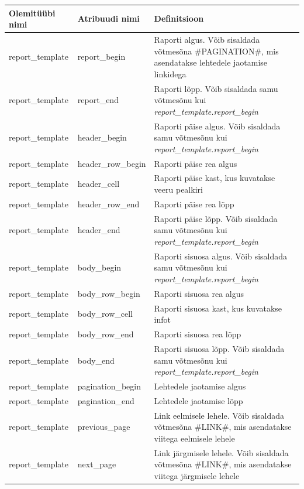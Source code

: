 \documentclass[a4paper,12pt]{article} %
\begin{document}
\begin{table}[H]
\centering
\begin{tabular}{|p{3cm}|p{3cm}|p{9cm}|}
\hline
\rowcolor{rowgray}
Olemitüübi nimi & Atribuudi nimi & Definitsioon \\ \hline

report\_template & report\_begin & Raporti algus. Võib sisaldada võtmesõna \#PAGINATION\#, mis asendatakse lehtedele jaotamise linkidega \\ \hline
report\_template & report\_end & Raporti lõpp. Võib sisaldada samu võtmesõnu kui \textit{report\_template.report\_begin} \\ \hline
report\_template & header\_begin & Raporti päise algus. Võib sisaldada samu võtmesõnu kui \textit{report\_template.report\_begin} \\ \hline
report\_template & header\_row\_begin & Raporti päise rea algus \\ \hline
report\_template & header\_cell & Raporti päise kast, kus kuvatakse veeru pealkiri \\ \hline
report\_template & header\_row\_end & Raporti päise rea lõpp \\ \hline
report\_template & header\_end & Raporti päise lõpp. Võib sisaldada samu võtmesõnu kui \textit{report\_template.report\_begin} \\ \hline
report\_template & body\_begin & Raporti sisuosa algus. Võib sisaldada samu võtmesõnu kui \textit{report\_template.report\_begin} \\ \hline
report\_template & body\_row\_begin & Raporti sisuosa rea algus \\ \hline
report\_template & body\_row\_cell & Raporti sisuosa kast, kus kuvatakse infot \\ \hline
report\_template & body\_row\_end & Raporti sisuosa rea lõpp \\ \hline
report\_template & body\_end & Raporti sisuosa lõpp. Võib sisaldada samu võtmesõnu kui \textit{report\_template.report\_begin} \\ \hline
report\_template & pagination\_begin & Lehtedele jaotamise algus \\ \hline
report\_template & pagination\_end & Lehtedele jaotamise lõpp \\ \hline
report\_template & previous\_page & Link eelmisele lehele. Võib sisaldada võtmesõna \#LINK\#, mis asendatakse viitega eelmisele lehele \\ \hline
report\_template & next\_page & Link järgmisele lehele. Võib sisaldada võtmesõna \#LINK\#, mis asendatakse viitega järgmisele lehele \\ \hline

\end{tabular}
\end{table}
\end{document}
